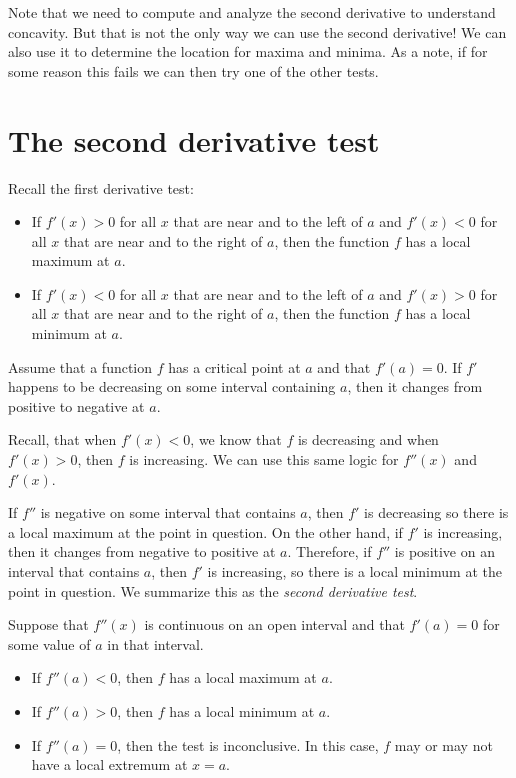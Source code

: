 \documentclass{ximera}
\begin{document}
Note that we need to compute and analyze the second derivative to
understand concavity. But that is not the only way we can use the second derivative! We can also use it to determine the location for maxima and minima. As a note, if for some reason this fails
we can then try one of the other tests.

\section{The second derivative test}


Recall the first derivative test:

\begin{itemize}
\item If $f'(x)>0$ for all $x$ that are near and to the left of $a$ and $f'(x)<0$  for all $x$ that are near and to the right of
  $a$, then the function $f$ has a local maximum at $a$.
\item If $f'(x)<0$ for all $x$ that are near and  to the left of $a$ and $f'(x)>0$ for all $x$ that are near and  to the right of
  $a$, then the function $f$ has a local minimum at $a$.
\end{itemize}

Assume that a function $f$ has  a critical point at $a$ and that $f'(a)=0$.
If $f'$  happens to be decreasing on some interval containing $a$, then it changes from positive to negative at $a$. 

Recall, that when $f'(x)<0$, we know that $f$ is decreasing and when $f'(x)>0$, then $f$ is increasing. We can use this same logic for $f''(x)$ and $f'(x)$.

If $f''$ is negative on some interval that contains $a$,
then $f'$ is decreasing so there is a local maximum at
the point in question. On the other hand, if $f'$ is increasing, then it changes from
negative to positive at $a$. Therefore,
if $f''$ is positive on an interval that contains $a$, then
$f'$ is increasing, so there is a local minimum at the
point in question. We summarize this as the \textit{second derivative
  test}.

\begin{theorem}\label{T:sdt}
Suppose that $f''(x)$ is continuous on an open interval and that
$f'(a)=0$ for some value of $a$ in that interval.
\begin{itemize}
\item If $f''(a) <0$, then $f$ has a local maximum at $a$.
\item If $f''(a) >0$, then $f$ has a local minimum at $a$.
\item If $f''(a) =0$, then the test is inconclusive. In this case,
  $f$ may or may not have a local extremum at $x=a$.
\end{itemize}
\end{theorem}
\end{document}

